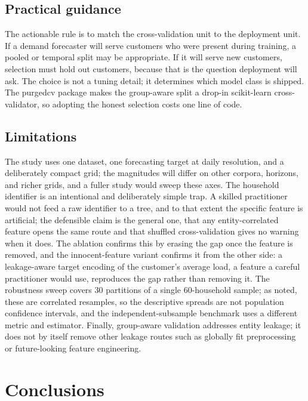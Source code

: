 \documentclass[10pt]{article}
\newcommand{\pcv}{\textsf{purgedcv}}
\newcommand{\pkg}[1]{\textsf{#1}}
\begin{document}
\subsection{Practical guidance}

The actionable rule is to match the cross-validation unit to the deployment unit.
If a demand forecaster will serve customers who were present during training, a
pooled or temporal split may be appropriate. If it will serve new customers,
selection must hold out customers, because that is the question deployment will
ask. The choice is not a tuning detail; it determines which model class is
shipped. The \pcv{} package makes the group-aware split a drop-in
\pkg{scikit-learn} cross-validator, so adopting the honest selection costs one
line of code.

\subsection{Limitations}

The study uses one dataset, one forecasting target at daily resolution, and a
deliberately compact grid; the magnitudes will differ on other corpora, horizons,
and richer grids, and a fuller study would sweep these axes. The household
identifier is an intentional and deliberately simple trap. A skilled practitioner
would not feed a raw identifier to a tree, and to that extent the specific
feature is artificial; the defensible claim is the general one, that any
entity-correlated feature opens the same route and that shuffled cross-validation
gives no warning when it does. The ablation confirms this by erasing the gap once
the feature is removed, and the innocent-feature variant confirms it from the
other side: a leakage-aware target encoding of the customer's average load, a
feature a careful practitioner would use, reproduces the gap rather than removing
it. The robustness sweep covers 30 partitions of a single 60-household sample; as
noted, these are correlated resamples, so the descriptive spreads are not
population confidence intervals, and the independent-subsample benchmark uses a
different metric and estimator. Finally, group-aware validation addresses entity
leakage; it does not by itself remove other leakage routes such as globally fit
preprocessing or future-looking feature engineering.

\section{Conclusions}
\end{document}
